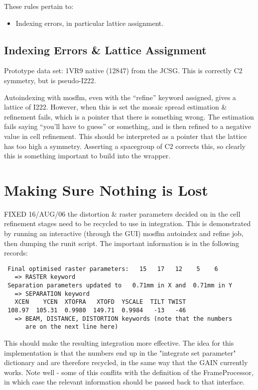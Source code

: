 \documentclass[a4paper, 11pt]{article}
\begin{document}
These rules pertain to:

\begin{itemize}
\item{Indexing errors, in particular lattice assignment.}
\end{itemize}

\subsection{Indexing Errors \& Lattice Assignment}

Prototype data set: 1VR9 native (12847) from the JCSG. This is correctly
C2 symmetry, but is pseudo-I222. 

Autoindexing with mosflm, even with the ``refine'' keyword assigned, gives
a lattice of I222. However, when this is set the mosaic spread 
estimation \& refinement fails, which is a pointer that there is 
something wrong. The estimation fails saying ``you'll have to guess'' or
something, and is then refined to a negative value in cell refinement. This
should be interpreted as a pointer that the lattice has too high a symmetry.
Asserting a spacegroup of C2 corrects this, so clearly this is something
important to build into the wrapper.

\section{Making Sure Nothing is Lost}

FIXED 16/AUG/06 the distortion \& raster parameters decided on in the 
cell refinement stages need to be recycled to use in integration. This is
demonstrated by running an interactive (through the GUI) mosflm autoindex
and refine job, then dumping the runit script. The important information is
in the following records:

{
\small
\begin{verbatim}
 Final optimised raster parameters:   15   17   12    5    6
   => RASTER keyword
 Separation parameters updated to   0.71mm in X and  0.71mm in Y
   => SEPARATION keyword
   XCEN    YCEN  XTOFRA   XTOFD  YSCALE  TILT TWIST
 108.97  105.31  0.9980  149.71  0.9984   -13   -46
   => BEAM, DISTANCE, DISTORTION keywords (note that the numbers
      are on the next line here)
\end{verbatim}
}

This should make the resulting integration more effective. The idea
for this implementation is that the numbers end up in the "integrate
set parameter" dictionary and are therefore recycled, in the same way
that the GAIN currently works. Note well - some of this conflits with the 
definition of the FrameProcessor, in which case the relevant information
should be passed back to that interface.
\end{document}
